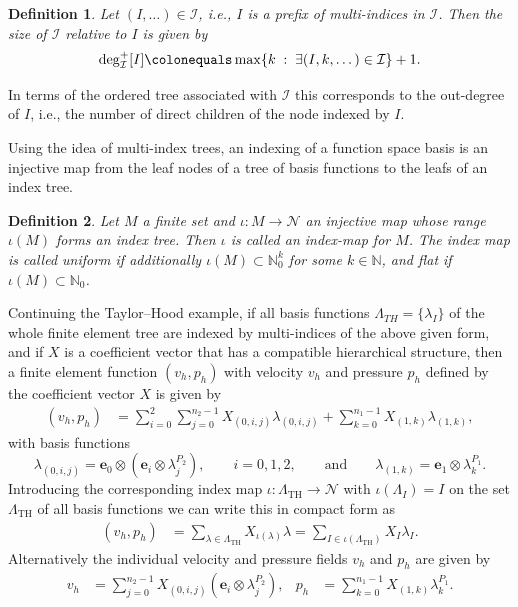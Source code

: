 \documentclass[a4paper,10pt,headings=normal,bibliography=totoc]{scrartcl}
\newtheorem{definition}{Definition}
\newcommand{\op}[1]{\operatorname{#1}}
\newcommand{\st}{\; : \;}
\begin{document}
\begin{definition}
Let $(I,\dots) \in \mathcal{I}$, i.e., $I$ is a
prefix of multi-indices in $\mathcal{I}$. Then the size of $\mathcal{I}$ relative
to $I$ is given by
\begin{align}\label{eq:prefix_size}
  \operatorname{deg}^+_{\mathcal{I}}[I] \colonequals  \op{max}\{k \st \exists (I,k,\dots) \in \mathcal{I} \}+1.
\end{align}
\end{definition}
In terms of the ordered tree associated with $\mathcal{I}$ this corresponds
to the out-degree of $I$, i.e., the number of direct children of the node indexed by $I$.

Using the idea of multi-index trees,
an indexing of a function space basis is an injective map from the leaf nodes of a tree of basis functions to the leafs of an
index tree.

\begin{definition}
  Let $M$ a finite set and $\iota:M \to \mathcal{N}$ an injective map whose range
  $\iota(M)$ forms an index tree.
  Then $\iota$ is called an \emph{index-map} for $M$.
  The index map is called \emph{uniform} if additionally $\iota(M) \subset \mathbb{N}^k_0$ for some $k \in \mathbb{N}$,
  and \emph{flat} if $\iota(M) \subset \mathbb{N}_0$.
\end{definition}

Continuing the Taylor--Hood example, if
all basis functions $\Lambda_{TH} = \{\lambda_I \}$ of the whole finite element tree are
indexed by multi-indices of the above given form,
and if $X$ is a coefficient vector that has a compatible hierarchical structure,
then a finite element function $(v_h,p_h)$ with velocity
$v_h$ and pressure $p_h$ defined by the coefficient vector $X$
is given by
\begin{align*}
  (v_h,p_h)
  &= \sum_{i=0}^2\sum_{j=0}^{n_2-1} X_{(0,i,j)}\lambda_{(0,i,j)}
  + \sum_{k=0}^{n_1-1} X_{(1,k)}\lambda_{(1,k)},
\end{align*}
with basis functions
\begin{equation*}
  \lambda_{(0,i,j)} = \mathbf{e}_0 \otimes (\mathbf{e}_i \otimes \lambda^{P_2}_j), \qquad i=0,1,2,
    \qquad \text{and} \qquad
    \lambda_{(1,k)} = \mathbf{e}_1 \otimes \lambda^{P_1}_k.
\end{equation*}
Introducing the corresponding index map $\iota : \Lambda_{\text{TH}} \to \mathcal{N}$
with $\iota(\Lambda_I)=I$ on the set $\Lambda_{\text{TH}}$ of all basis functions
we can write this in compact form as
\begin{align*}
  (v_h,p_h) &= \sum_{\lambda \in \Lambda_{\text{TH}}} X_{\iota(\lambda)} \lambda
            = \sum_{I \in \iota(\Lambda_{\text{TH}})} X_I \lambda_I.
\end{align*}
Alternatively the individual velocity and pressure fields
$v_h$ and $p_h$ are given by
\begin{align*}
  v_h &= \sum_{j=0}^{n_2-1} X_{(0,i,j)} (\mathbf{e}_i \otimes \lambda^{P_2}_j),
    &
    p_h &= \sum_{k=0}^{n_1-1} X_{(1,k)}\lambda^{P_1}_k.
\end{align*}
\end{document}
